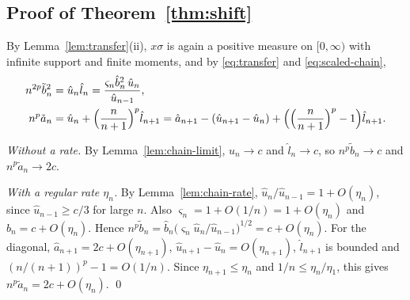 \subsection{\texorpdfstring{Proof of Theorem~\ref{thm:shift}}{Proof of Theorem 3.1}}

By Lemma~\ref{lem:transfer}(ii), $x\sigma$ is again a positive measure on $[0,\infty)$ with infinite support and finite
moments, and by \eqref{eq:transfer} and \eqref{eq:scaled-chain},
\begin{align*}
  n^{2p}\tilde b_n^2&=\hat u_n\hat l_n=\frac{\varsigma_n\hat b_n^2\,\hat u_n}{\hat u_{n-1}},\\
  n^p\tilde a_n&=\hat u_n+\Bigl(\frac n{n+1}\Bigr)^p\hat l_{n+1}
  =\hat a_{n+1}-(\hat u_{n+1}-\hat u_n)+\Bigl(\Bigl(\frac n{n+1}\Bigr)^p-1\Bigr)\hat l_{n+1}.
\end{align*}

\emph{Without a rate.} By Lemma~\ref{lem:chain-limit}, $\hat u_n\to c$ and $\hat l_n\to c$, so $n^p\tilde b_n\to c$ and
$n^p\tilde a_n\to2c$.

\emph{With a regular rate $\eta_n$.} By Lemma~\ref{lem:chain-rate}, $\hat u_n/\hat u_{n-1}=1+O(\eta_n)$, since
$\hat u_{n-1}\ge c/3$ for large $n$. Also $\varsigma_n=1+O(1/n)=1+O(\eta_n)$ and $\hat b_n=c+O(\eta_n)$. Hence
$n^p\tilde b_n=\hat b_n\bigl(\varsigma_n\hat u_n/\hat u_{n-1}\bigr)^{1/2}=c+O(\eta_n)$. For the diagonal, $\hat
a_{n+1}=2c+O(\eta_{n+1})$, $\hat u_{n+1}-\hat u_n=O(\eta_{n+1})$, $\hat l_{n+1}$ is bounded and
$(n/(n+1))^p-1=O(1/n)$. Since $\eta_{n+1}\le\eta_n$ and $1/n\le\eta_n/\eta_1$, this gives $n^p\tilde a_n=2c+O(\eta_n)$.
\qed

